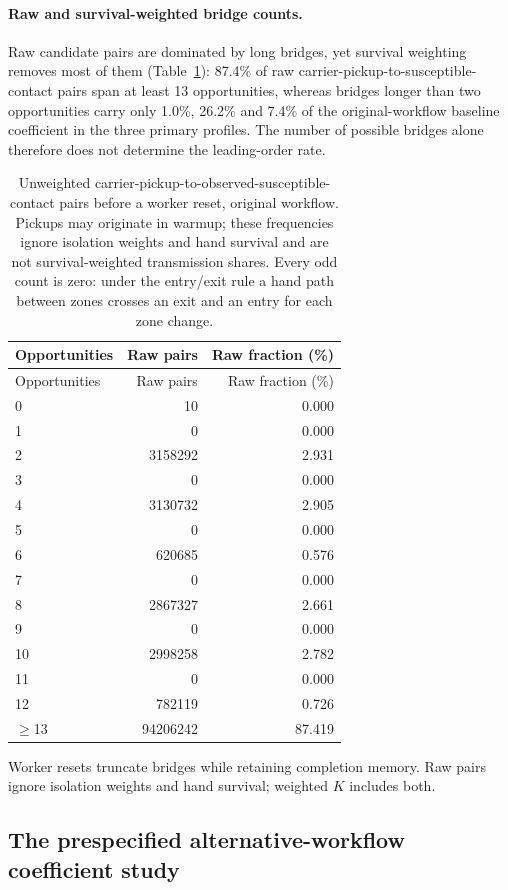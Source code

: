 \documentclass[11pt]{article}
\begin{document}
\paragraph{Raw and survival-weighted bridge counts.} Raw candidate pairs are
dominated by long bridges, yet survival weighting removes most of them
(Table~\ref{tab:raw-bridges}): 87.4\% of raw carrier-pickup-to-susceptible-contact
pairs span at least 13 opportunities, whereas bridges longer than two
opportunities carry only 1.0\%, 26.2\% and 7.4\% of the original-workflow
baseline coefficient in the three primary profiles. The number of possible
bridges alone therefore does not determine the leading-order rate.

{\small\setlength{\tabcolsep}{4pt}
\begin{longtable}{lrr}
\caption{Unweighted carrier-pickup-to-observed-susceptible-contact pairs before a worker reset, original workflow. Pickups may originate in warmup; these frequencies ignore isolation weights and hand survival and are not survival-weighted transmission shares. Every odd count is zero: under the entry/exit rule a hand path between zones crosses an exit and an entry for each zone change.}\label{tab:raw-bridges}\\
\toprule
Opportunities & Raw pairs & Raw fraction (\%)\\
\midrule\endfirsthead
Opportunities & Raw pairs & Raw fraction (\%)\\
\midrule\endhead
0 & 10 & 0.000\\
1 & 0 & 0.000\\
2 & 3158292 & 2.931\\
3 & 0 & 0.000\\
4 & 3130732 & 2.905\\
5 & 0 & 0.000\\
6 & 620685 & 0.576\\
7 & 0 & 0.000\\
8 & 2867327 & 2.661\\
9 & 0 & 0.000\\
10 & 2998258 & 2.782\\
11 & 0 & 0.000\\
12 & 782119 & 0.726\\
$\ge$13 & 94206242 & 87.419\\
\bottomrule
\end{longtable}
}
Worker resets truncate bridges while retaining completion memory. Raw pairs
ignore isolation weights and hand survival; weighted $K$ includes both.

\subsection{The prespecified alternative-workflow coefficient study}\label{sec:s-coef-alt}
\end{document}
